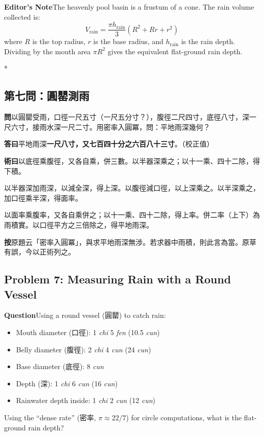 \documentclass[11pt,a4paper]{article}
\newcommand{\WenCN}{\textbf{\color{headcolor}問}}
\newcommand{\DaCN}{\textbf{\color{headcolor}答曰}}
\newcommand{\ShuCN}{\textbf{\color{headcolor}術曰}}
\newcommand{\AnCN}{\textbf{\color{headcolor}按}}
\newcommand{\WenEN}{\textbf{\color{headcolor}Question}}
\newcommand{\AnEN}{\textbf{\color{headcolor}Editor's Note}}
\begin{document}
\vspace{0.5em}
\AnEN{}\quad The heavenly pool basin is a frustum of a cone. The rain volume collected is:
\[
V_{\text{rain}} = \frac{\pi h_{\text{rain}}}{3}\left(R^2 + Rr + r^2\right)
\]
where $R$ is the top radius, $r$ is the base radius, and $h_{\text{rain}}$ is the rain depth. Dividing by the mouth area $\pi R^2$ gives the equivalent flat-ground rain depth.

\newpage

\switchcolumn[0]*
\subsection*{第七問：圓罌測雨}

\vspace{0.5em}
\WenCN{}\quad 以圓罌受雨，口徑一尺五寸（一尺五分寸？），腹徑二尺四寸，底徑八寸，深一尺六寸，接雨水深一尺二寸。用密率入圓冪，問：平地雨深幾何？

\vspace{0.5em}
\DaCN{}\quad 平地雨深\textbf{一尺八寸，又七百四十分之六百八十三寸}。（校正值）

\vspace{0.5em}
\ShuCN{}\quad 以底徑乘腹徑，又各自乘，併三數。以半器深乘之；以十一乘、四十二除，得下積。

以半器深加雨深，以減全深，得上深。以腹徑減口徑，以上深乘之。以半深乘之，加口徑乘半深，得面率。

以面率乘腹率，又各自乘併之；以十一乘、四十二除，得上率。併二率（上下）為雨積實。以口徑平方之三倍除之，得平地雨深。

\vspace{0.5em}
\AnCN{}\quad 原題云「密率入圓冪」，與求平地雨深無涉。若求器中雨積，則此言為當。原草有誤，今以正術列之。

\switchcolumn[1]
\subsection*{Problem 7: Measuring Rain with a Round Vessel}
\label{sec:yuanyingceyu}

\vspace{0.5em}
\WenEN{}\quad Using a round vessel (圓罌) to catch rain:
\begin{itemize}[noitemsep,topsep=0pt]
  \item Mouth diameter (口徑): 1 \textit{chi} 5 \textit{fen} (10.5 \textit{cun})
  \item Belly diameter (腹徑): 2 \textit{chi} 4 \textit{cun} (24 \textit{cun})
  \item Base diameter (底徑): 8 \textit{cun}
  \item Depth (深): 1 \textit{chi} 6 \textit{cun} (16 \textit{cun})
  \item Rainwater depth inside: 1 \textit{chi} 2 \textit{cun} (12 \textit{cun})
\end{itemize}
Using the ``dense rate'' (密率, $\pi \approx 22/7$) for circle computations, what is the flat-ground rain depth?
\end{document}
